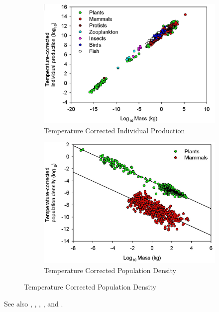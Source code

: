 \documentclass[]{article}
\begin{document}
\begin{figure}[H]
	\caption{And Ecology}\label{eq:AndEcology}
	\begin{subfigure}[b]{0.5\textwidth}
		\caption{Temperature Corrected Individual Production}
		\includegraphics[width=\textwidth]{AndEcology1}
	\end{subfigure}
	\begin{subfigure}[b]{0.5\textwidth}
		\caption{Temperature Corrected Population Density}
		\includegraphics[width=\textwidth]{AndEcology2}
	\end{subfigure}
\end{figure}
See also \cite{odum1976energy}, \cite{odum1983systems}, \cite{schmidt1997animal}, \cite{brown2004toward}, and \cite{kempes2017thermodynamic}.


\printglossaries

 


\end{document}
